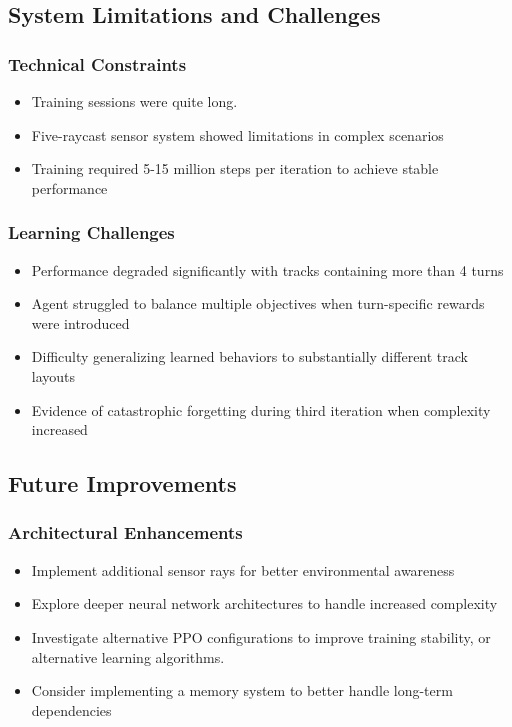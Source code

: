 \documentclass[10pt,twocolumn]{article}
\begin{document}
\subsection{System Limitations and Challenges}
\subsubsection{Technical Constraints}
\begin{itemize}
\item Training sessions were quite long.
\item Five-raycast sensor system showed limitations in complex scenarios
\item Training required 5-15 million steps per iteration to achieve stable performance
\end{itemize}
\subsubsection{Learning Challenges}
\begin{itemize}
\item Performance degraded significantly with tracks containing more than 4 turns
\item Agent struggled to balance multiple objectives when turn-specific rewards were introduced
\item Difficulty generalizing learned behaviors to substantially different track layouts
\item Evidence of catastrophic forgetting during third iteration when complexity increased
\end{itemize}
\subsection{Future Improvements}
\subsubsection{Architectural Enhancements}
\begin{itemize}
\item Implement additional sensor rays for better environmental awareness
\item Explore deeper neural network architectures to handle increased complexity
\item Investigate alternative PPO configurations to improve training stability, or alternative learning algorithms.
\item Consider implementing a memory system to better handle long-term dependencies
\end{itemize}
\end{document}
